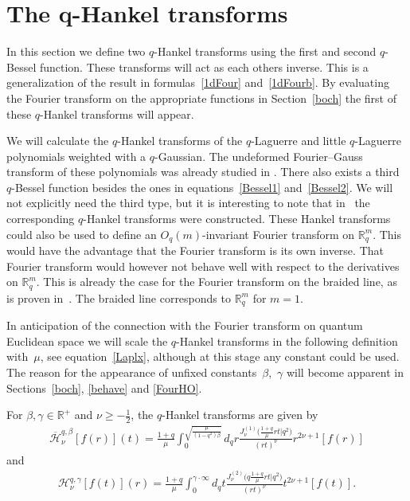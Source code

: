 \documentclass[11pt]{article}
\newcommand{\mR}{\mathbb{R}}
\newcommand{\cH}{\mathcal{H}}
\numberwithin{equation}{section}
\begin{document}
\section[The $q$-Hankel transforms]{The $\boldsymbol{q}$-Hankel transforms}
\label{Hanksect}

In this section we def\/ine two $q$-Hankel transforms using the f\/irst and second $q$-Bessel function. These transforms will act as each others inverse. This is a generalization of the result in formulas~\eqref{1dFour} and~\eqref{1dFourb}. By evaluating the Fourier transform on the appropriate functions in Section~\ref{boch} the f\/irst of these $q$-Hankel transforms will appear.

We will calculate the $q$-Hankel transforms of the $q$-Laguerre and little $q$-Laguerre polynomials weighted with a $q$-Gaussian. The undeformed Fourier--Gauss transform of these polynomials was already studied in \cite{MR1479780}. There also exists a third $q$-Bessel function besides the ones in equations~\eqref{Bessel1} and~\eqref{Bessel2}. We will not explicitly need the third type, but it is interesting to note that in~\cite{MR1069750, MR2445269} the corresponding $q$-Hankel transforms were constructed. These Hankel transforms could also be used to def\/ine an $O_q(m)$-invariant Fourier transform on $\mR^m_q$. This would have the advantage that the Fourier transform is its own inverse. That Fourier transform would however not behave well with respect to the derivatives on $\mR^m_q$. This is already the case for the Fourier transform on the braided line, as is proven in~\cite{MR1069750}. The braided line corresponds to $\mR^m_q$ for $m=1$.


In anticipation of the connection with the Fourier transform on quantum Euclidean space we will scale the $q$-Hankel transforms in the following def\/inition with~$\mu$, see equation~\eqref{Laplx}, although at this stage any constant could be used. The reason for the appearance of unf\/ixed constants~$\beta$,~$\gamma$ will become apparent in Sections~\ref{boch}, \ref{behave} and \ref{FourHO}.
\begin{definition}
\label{defHankel}
For $\beta,\gamma\in\mR^+$ and $\nu\ge-\frac{1}{2}$, the $q$-Hankel transforms are given by
\begin{gather*}
\overline{\cH}_{\nu}^{q,\beta}[f(r)](t) = \frac{1+q}{\mu}\int_0^{\sqrt{\frac{\mu}{(1-q^2)\beta}}}d_qr\frac{J_\nu^{(1)}\big(\frac{1+q}{\mu}rt|q^2\big)}{(rt)^{\nu}}r^{2\nu+1}[f(r)]
\end{gather*}
and
\begin{gather*}
\cH^{q,\gamma}_{\nu}[f(t)](r) = \frac{1+q}{\mu}\int_0^{\gamma\cdot\infty}d_qt\frac{J_\nu^{(2)}\big(q\frac{1+q}{\mu}rt|q^2\big)}{(rt)^{\nu}}t^{2\nu+1}[f(t)].
\end{gather*}
\end{definition}
\end{document}
